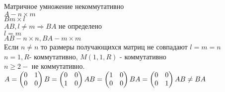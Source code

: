 Матричное умножение некоммутативно \\
$ A - n \times m$\\
$ B m \times l $ \\
$ AB, l \neq m \Rightarrow BA $ не определено \\
$ l = m $\\
$ AB - n \times n, BA - m \times m $\\
Если $ n \neq n $ то размеры получающихся матриц не совпадают
$ l = m = n $ \\
$ n = 1, R $- коммутативно, $ M(1,1,R) $ - коммутативно \\
$ n \geq 2 - $ не коммутативно.\\
$ A = \begin{pmatrix}
0 & 1\\
0 & 0 
\end{pmatrix}
B = \begin{pmatrix}
0 & 0 \\
1 & 0
\end{pmatrix} \\
AB = \begin{pmatrix}
1 & 0 \\
0 & 0 
\end{pmatrix}
BA = \begin{pmatrix}
0 & 0\\
0 & 1
\end{pmatrix} AB \neq BA$
